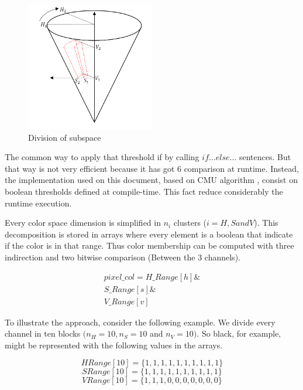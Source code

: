 \begin{figure}[h]
	\centering
	\includegraphics[width=0.5\textwidth,natwidth=659,natheight=659]{../Images/c2/DividingSubSpace.png}
	\caption{Division of subspace}
	\label{fig:DividingSubSpace}
\end{figure}

The common way to apply that threshold if by calling $if...else...$ sentences. But that way is not very efficient because it has got 6 comparison at runtime. Instead, the implementation used on this document, based on CMU algorithm \cite{JamesBruce_CMU_SEG}, consist on boolean thresholds defined at compile-time. This fact reduce considerably the runtime execution. 

Every color space dimension is simplified in $n_i$ clusters ($i = H, S and V$). This decomposition is stored in arrays where every element is a boolean that indicate if the color is in that range. Thus color membership can be computed with three indirection and two bitwise comparison (Between the 3 channels). 

\begin{equation}
\begin{split}
pixel\_col = H\_Range[h] \& \\
S\_Range[s] \& \\
V\_Range[v] 
\end{split}
\end{equation}
	

To illustrate the approach, consider the following example. We divide every channel in ten blocks $(n_H = 10, n_S = 10$ and $n_V = 10)$. So black, for example, might be  represented with the following values in the arrays.

{\centering
\[HRange[10] = \{1, 1, 1, 1, 1, 1, 1, 1, 1, 1\}\]
\[SRange[10] = \{1, 1, 1, 1, 1, 1, 1, 1, 1, 1\}\]
\[VRange[10] = \{1, 1, 1, 0, 0, 0, 0, 0, 0, 0\}\]
} 

